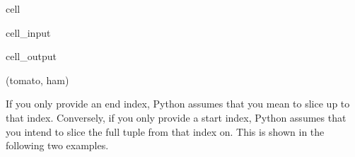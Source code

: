 \documentclass[letterpaper,10pt,english]{jupyterBook}
\begin{document}
\begin{sphinxuseclass}{cell}\begin{sphinxVerbatimInput}

\begin{sphinxuseclass}{cell_input}
\begin{sphinxVerbatim}[commandchars=\\\{\}]
       
\PYG{p}{[}\PYG{p}{]}
\end{sphinxVerbatim}

\end{sphinxuseclass}\end{sphinxVerbatimInput}
\begin{sphinxVerbatimOutput}

\begin{sphinxuseclass}{cell_output}
\begin{sphinxVerbatim}[commandchars=\\\{\}]
(\PYGZsq{}tomato\PYGZsq{}, \PYGZsq{}ham\PYGZsq{})
\end{sphinxVerbatim}

\end{sphinxuseclass}\end{sphinxVerbatimOutput}

\end{sphinxuseclass}
\sphinxAtStartPar
If you only provide an end index, Python assumes that you mean to slice up to that index. Conversely, if you only provide a start index, Python assumes that you intend to slice the full tuple from that index on. This is shown in the following two examples.
\end{document}

